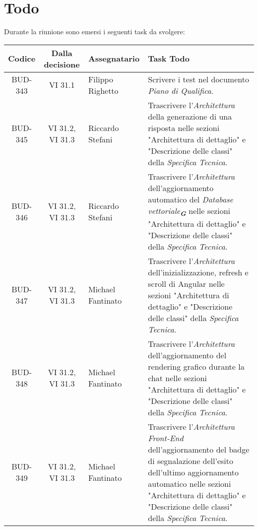 
\section{Todo}

Durante la riunione sono emersi i seguenti task da svolgere:

\vspace{0.5cm}

\begin{table}[htbp]
\centering
{}
\begin{tabular}{|c|c|p{}|p{}|}
    \hline
    \rowcolor[gray]{0.75}
    \textbf{Codice} & \textbf{Dalla decisione} & \textbf{Assegnatario} & \textbf{Task Todo} \\
    \hline
    BUD-343 & VI 31.1 & Filippo Righetto & Scrivere i test nel documento \emph{Piano di Qualifica}.\\
    \hline
    BUD-345 & VI 31.2, VI 31.3 & Riccardo Stefani & Trascrivere l'\emph{Architettura} della generazione di una risposta nelle sezioni "Architettura di dettaglio" e "Descrizione delle classi" della \emph{Specifica Tecnica}.\\
    \hline
    BUD-346 & VI 31.2, VI 31.3 & Riccardo Stefani & Trascrivere l'\emph{Architettura} dell'aggiornamento automatico del \emph{Database vettoriale}\textsubscript{\textit{\textbf{G}}} nelle sezioni "Architettura di dettaglio" e "Descrizione delle classi" della \emph{Specifica Tecnica}. \\
    \hline 
    BUD-347 & VI 31.2, VI 31.3 & Michael Fantinato & Trascrivere l'\emph{Architettura} dell’inizializzazione, refresh e scroll di Angular nelle sezioni "Architettura di dettaglio" e "Descrizione delle classi" della \emph{Specifica Tecnica}. \\
    \hline
    BUD-348 & VI 31.2, VI 31.3 & Michael Fantinato & Trascrivere l'\emph{Architettura} dell’aggiornamento del rendering grafico durante la chat nelle sezioni "Architettura di dettaglio" e "Descrizione delle classi" della \emph{Specifica Tecnica}. \\
    \hline
    BUD-349 & VI 31.2, VI 31.3 & Michael Fantinato & Trascrivere l'\emph{Architettura} \emph{Front-End} dell’aggiornamento del badge di segnalazione dell’esito dell’ultimo aggiornamento automatico nelle sezioni "Architettura di dettaglio" e "Descrizione delle classi" della \emph{Specifica Tecnica}. \\

\end{tabular}
\end{table}
